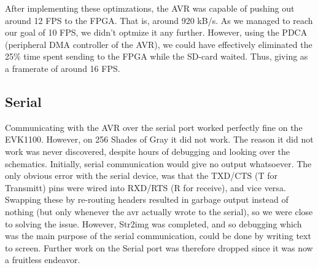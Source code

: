 After implementing these optimzations, the AVR was capable of pushing out around 12 FPS to the FPGA. That is, around 920 kB/s. As we managed to reach our goal of 10 FPS, we didn't optmize it any further. However, using the PDCA (peripheral DMA controller of the AVR), we could have effectively eliminated the 25\% time spent sending to the FPGA while the SD-card waited. Thus, giving as a framerate of around 16 FPS.

\subsection{Serial}
\label{sec:avr-serial-issues}
Communicating with the AVR over the serial port worked perfectly fine on the EVK1100. However, on 256
Shades of Gray it did not work. The reason it did not work was never discovered, despite hours of
debugging and looking over the schematics. Initially, serial communication would give no output
whatsoever. The only obvious error with the serial device, was that the TXD/CTS (T for Transmitt)
pins were wired into RXD/RTS (R for receive), and vice versa. Swapping these by re-routing headers
resulted in garbage output instead of nothing (but only whenever the avr actually wrote to the serial),
so we were close to solving the issue. However, Str2img was completed, and so debugging which
was the main purpose of the serial communication, could be done by writing text to screen. Further
work on the Serial port was therefore dropped since it was now a fruitless endeavor.
